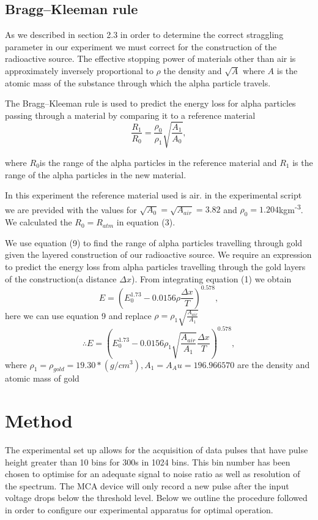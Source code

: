 \documentclass[a4paper]{article}
\begin{document}
\begin{multicols}{2}
\subsection{Bragg--Kleeman rule}
As we described in section 2.3 in order to determine the correct straggling parameter in our experiment we must correct for the construction of the radioactive source. The effective stopping power of materials other than air is approximately inversely proportional to $\rho$ the density and $\sqrt{A}$ where $A$ is the atomic mass of the substance through which the alpha particle travels.

The Bragg--Kleeman rule is used to predict the energy loss for alpha particles passing through a material by comparing it to a reference material
\begin{equation} \frac{R_1}{R_0} = \frac{\rho_0}{\rho_1}\sqrt{\frac{A_1}{A_0}},
\end{equation}

where $R_0$is the range of the alpha particles in the reference material and $R_1$ is the range of the alpha particles in the new material.

In this experiment the reference material used is air.
in the experimental script we are previded with the values for $\sqrt{A_0} = \sqrt{A_{air}} = 3.82$ and $\rho_0 = 1.204$kgm\textsuperscript{-3}. We calculated the $R_0 = R_{atm}$ in equation (3).

We use equation (9) to find the range of alpha particles travelling through gold given the layered construction of our radioactive source. We require an expression to predict the energy loss from alpha particles travelling through the gold layers of the construction(a distance $\Delta x$). 
From integrating equation (1) we obtain
\begin{equation} E = \left(E_0^{1.73} -0.0156 \rho \frac{\Delta x}{T} \right)^{0.578},
\end{equation}
here we can use equation 9 and replace $\rho =  \rho_1\sqrt{\frac{A_{air}}{A_1}}$
\begin{equation} \therefore E = \left(E_0^{1.73} -0.0156 \rho_1\sqrt{\frac{A_{air}}{A_1}} \frac{\Delta x}{T} \right)^{0.578},
\end{equation}
where $\rho_1 = \rho_{gold} = 19.30 * (g / cm^3), A_1 = A_Au = 196.966570$ are the density and atomic mass of gold\cite{gold}

\section{Method}
The experimental set up allows for the acquisition of data pulses that have pulse height greater than 10 bins for 300s in 1024 bins. 
This bin number has been chosen to optimise for an adequate signal to noise ratio as well as resolution of the spectrum.
The MCA device will only record a new pulse after the input voltage drops below the threshold level\cite{SPA}.
Below we outline the procedure followed in order to configure our experimental apparatus for optimal operation. 


\end{multicols}
\end{document}
